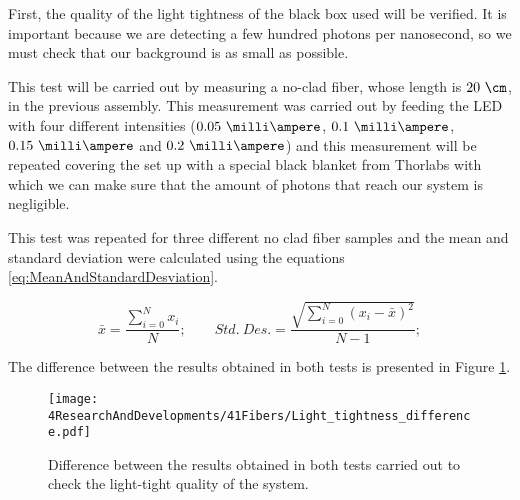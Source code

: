 First, the quality of the light tightness of the black box used will be verified. It is important because we are detecting a few hundred photons per nanosecond, so we must check that our background is as small as possible.

This test will be carried out by measuring a no-clad fiber, whose length is $20~\cm$, in the previous assembly. This measurement was carried out by feeding the LED with four different intensities ($0.05~\milli\ampere$, $0.1~\milli\ampere$, $0.15~\milli\ampere$ and $0.2~\milli\ampere$) and this measurement will be repeated covering the set up with a special black blanket from Thorlabs \cite{BlackBlancket} with which we can make sure that the amount of photons that reach our system is negligible. 

This test was repeated for three different no clad fiber samples and the mean and standard deviation were calculated using the equations \ref{eq:MeanAndStandardDesviation}.

\begin{equation}
\bar{x}=\frac{\sum_{i=0}^{N}x_i}{N}; \qquad Std.~Des. = \frac{\sqrt{\sum_{i=0}^{N}(x_i-\bar{x})^2}}{N-1};
\label{eq:MeanAndStandardDesviation}
\end{equation}

The difference between the results obtained in both tests is presented in Figure \ref{fig:LightTightnessTest}.


\begin{figure}[h]
\centering
\texttt{[image: 4ResearchAndDevelopments/41Fibers/Light\_tightness\_difference.pdf]}
\caption{Difference between the results obtained in both tests carried out to check the light-tight quality of the system.\label{fig:LightTightnessTest}}
\end{figure}

